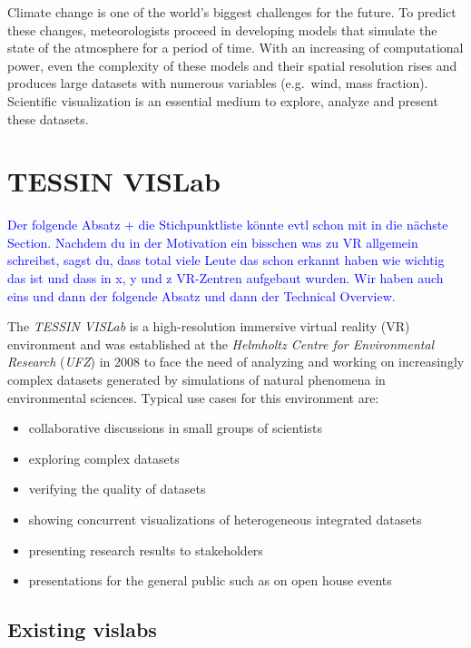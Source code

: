 \documentclass[twocolumn]{svjour3}          %
\newcommand{\myedit}[2]{\textcolor{red}{\st{#1}} \textcolor{blue}{#2}}
\begin{document}
Climate change is one of the world's biggest challenges for the future. To predict these changes, meteorologists proceed in developing models that simulate the state of the atmosphere for a period of time. With an increasing of computational power, even the complexity of these models and their spatial resolution rises and produces large datasets with numerous variables (e.g.~wind, mass fraction). Scientific visualization is an essential medium to explore, analyze and present these datasets.

\section{TESSIN VISLab}
\label{tessin-vislab}

\myedit{}{Der folgende Absatz + die Stichpunktliste k\"onnte evtl schon mit in die n\"achste Section. Nachdem du in der Motivation ein bisschen was zu VR allgemein schreibst, sagst du, dass total viele Leute das schon erkannt haben wie wichtig das ist und dass in x, y und z VR-Zentren aufgebaut wurden. Wir haben auch eins und dann der folgende Absatz und dann der Technical Overview.}
\bigskip

The \emph{TESSIN VISLab} is a high-resolution immersive virtual reality (VR) environment and was established at the \emph{Helmholtz Centre for Environmental Research} (\emph{UFZ}) in 2008 to face the need of analyzing and working on increasingly complex datasets generated by simulations of natural phenomena in environmental sciences. Typical use cases for this environment are:

\begin{itemize}
\itemsep1pt\parskip0pt
\item
  collaborative discussions in small groups of scientists
\item
  exploring complex datasets
\item
  verifying the quality of datasets
\item
  showing concurrent visualizations of heterogeneous integrated datasets
\item
  presenting research results to stakeholders
\item
  presentations for the general public such as on open house events
\end{itemize}

\subsection{Existing vislabs}
\label{existing-vislabs}
\end{document}
